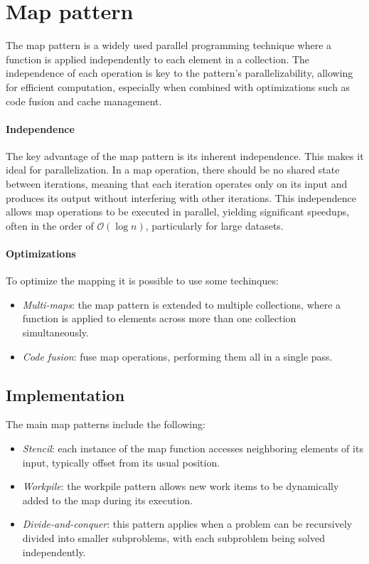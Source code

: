 \section{Map pattern}

The map pattern is a widely used parallel programming technique where a function is applied independently to each element in a collection. 
The independence of each operation is key to the pattern's parallelizability, allowing for efficient computation, especially when combined with optimizations such as code fusion and cache management.

\paragraph*{Independence}
The key advantage of the map pattern is its inherent independence. 
This makes it ideal for parallelization. 
In a map operation, there should be no shared state between iterations, meaning that each iteration operates only on its input and produces its output without interfering with other iterations.
This independence allows map operations to be executed in parallel, yielding significant speedups, often in the order of $\mathcal{O}(\log n)$, particularly for large datasets.

\paragraph*{Optimizations}
To optimize the mapping it is possible to use some techinques: 
\begin{itemize}
    \item \textit{Multi-maps}: the map pattern is extended to multiple collections, where a function is applied to elements across more than one collection simultaneously. 
    \item \textit{Code fusion}: fuse map operations, performing them all in a single pass.
\end{itemize}

\subsection{Implementation}
The main map patterns include the following:
\begin{itemize}
    \item \textit{Stencil}: each instance of the map function accesses neighboring elements of its input, typically offset from its usual position. 
    \item \textit{Workpile}: the workpile pattern allows new work items to be dynamically added to the map during its execution. 
    \item \textit{Divide-and-conquer}: this pattern applies when a problem can be recursively divided into smaller subproblems, with each subproblem being solved independently. 
\end{itemize}
